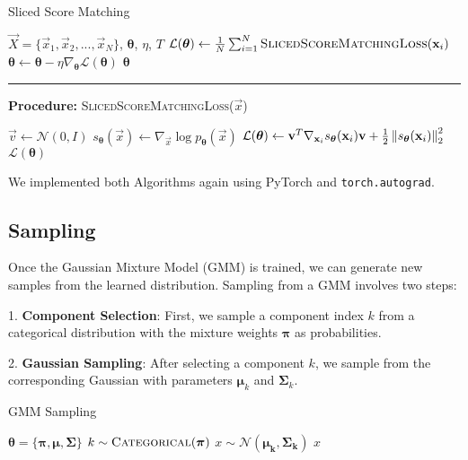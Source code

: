 \begin{algorithm}[H]
    \caption{Sliced Score Matching}
    \begin{algorithmic}[1]  
        \Require $\vec X = \{\vec x_1, \vec x_2, ..., \vec x_N\}$, $\boldsymbol{\theta}$, $\eta$, $T$
            \State $\mathcal{L}(\boldsymbol{\theta}) \gets \frac{1}{N} \sum_{i=1}^N \textsc{SlicedScoreMatchingLoss}(\vec x_i)$
            \State $\boldsymbol{\theta} \gets \boldsymbol{\theta} - \eta \nabla_{\boldsymbol{\theta}} \mathcal{L}(\boldsymbol{\theta})$
        \EndFor
        \State \Return $\boldsymbol{\theta}$
        \end{algorithmic}
        \noindent\rule{\linewidth}{0.4pt} 
        \textbf{Procedure:} \textsc{SlicedScoreMatchingLoss}($\vec x$)
        \begin{algorithmic}[1]
            \State $\vec v \gets \mathcal{N}(0, I)$
            \State $s_{\boldsymbol{\theta}}(\vec x) \gets \nabla_{\vec x} \log p_{\boldsymbol{\theta}}(\vec x)$
            \State $\mathcal{L}(\boldsymbol{\theta}) \gets \vec{v}^T \nabla_{\vec x_i} s_{\boldsymbol{\theta}}(\vec x_i) \vec{v} + \frac{1}{2} \norm{  s_{\boldsymbol{\theta}}(\vec x_i) }^2_2$
            \State \Return $\mathcal{L}(\boldsymbol{\theta})$
        \end{algorithmic}
\end{algorithm}

We implemented both Algorithms again using PyTorch \cite{pytorch} and \texttt{torch.autograd}. 

\subsection{Sampling}
\label{sec:gmm_sampling}

Once the Gaussian Mixture Model (GMM) is trained, we can generate new samples from the learned distribution. Sampling from a GMM involves two steps:

1. \textbf{Component Selection}: First, we sample a component index $k$ from a categorical distribution with the mixture weights $\boldsymbol{\pi}$ as probabilities.
   
2. \textbf{Gaussian Sampling}: After selecting a component $k$, we sample from the corresponding Gaussian with parameters $\boldsymbol{\mu}_k$ and $\boldsymbol{\Sigma}_k$. 

\begin{algorithm}
    \caption{GMM Sampling}
    \label{alg:gmm_sampling}
    \begin{algorithmic}[1]  
        \Require $\boldsymbol{\theta} = \{\boldsymbol{\pi}, \boldsymbol{\mu}, \boldsymbol{\Sigma}\}$
            \State $ k \sim \textsc{Categorical}(\boldsymbol{\pi})$
            \State $ x \sim \mathcal{N}(\boldsymbol{\mu_k}, \boldsymbol{\Sigma_k})$
        \State \Return $x$
    \end{algorithmic}
\end{algorithm}

